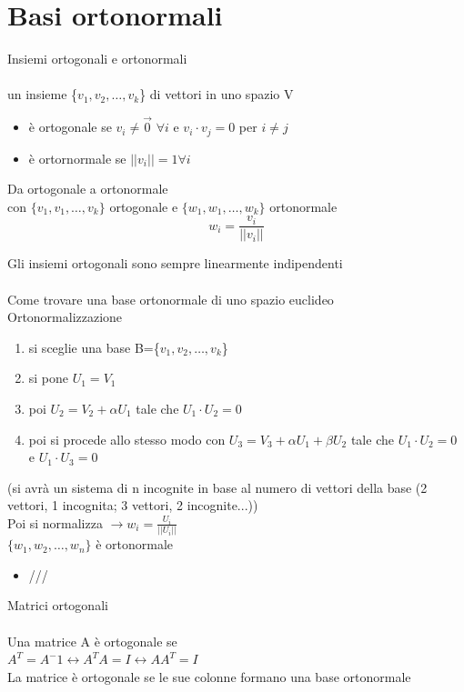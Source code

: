\documentclass{article}
\begin{document}
\section{Basi ortonormali}
{\Large Insiemi ortogonali e ortonormali}\\\\
un insieme \{\(v_1,v_2,\ldots,v_k\)\} di vettori in uno spazio V
\begin{itemize}
    \item  è ortogonale se \(v_i\neq\vec{0}\)  \(\forall i\)   e \(v_i\cdot v_j = 0\) per \(i\neq j\)
    \item è ortornormale se \(\lvert\lvert v_i \rvert\rvert = 1 \forall i\)
\end{itemize}
\begin{center}
    {\large Da ortogonale a ortonormale}\\
    con \(\{v_1,v_1,\ldots,v_k\}\) ortogonale e \(\{w_1,w_1,\ldots,w_k\}\) ortonormale
    \[w_i=\frac{v_i}{\lvert\lvert v_i \rvert\rvert}\]
\end{center}
Gli insiemi ortogonali sono sempre linearmente indipendenti\\\\
{\large Come trovare una base ortonormale di uno spazio euclideo}\\
Ortonormalizzazione
\begin{enumerate}
    \item si sceglie una base B=\{\(v_1,v_2,\ldots,v_k\)\}
    \item si pone \(U_1=V_1\)
    \item poi \(U_2 = V_2 + \alpha U_1 \) tale che \(U_1 \cdot U_2 = 0\)
    \item poi si procede allo stesso modo con  \(U_3 = V_3 + \alpha U_1 + \beta U_2\) tale che \(U_1 \cdot U_2 = 0\) e \(U_1 \cdot U_3 = 0\)
\end{enumerate}
(si avrà un sistema di n incognite in base al numero di vettori della base (2 vettori, 1 incognita; 3 vettori, 2 incognite...))\\
Poi si normalizza \(\rightarrow{} w_i=\frac{U_i}{\lvert\lvert U_i \rvert\rvert}\)\\
\(\{w_1,w_2,\ldots,w_n\}\) è ortonormale
\begin{itemize}
    \item ///\\
\end{itemize}
{\large Matrici ortogonali}\\\\
Una matrice A è ortogonale se \\
\(A^T=A^-1 \leftrightarrow A^TA = I \leftrightarrow AA^T = I\)\\
La matrice è ortogonale se le sue colonne formano una base ortonormale\\\\
\end{document}
